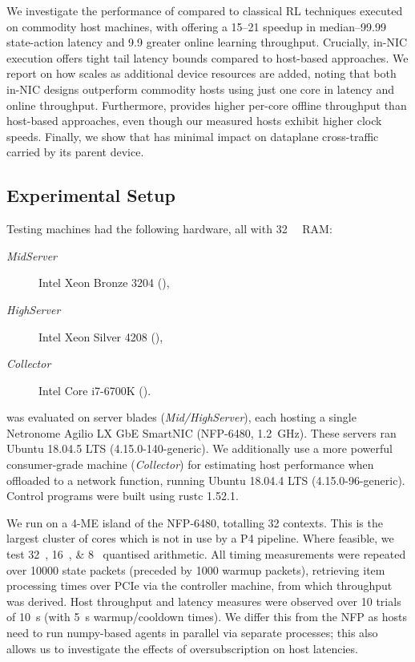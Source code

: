 We investigate the performance of \approachshort{} compared to classical RL techniques executed on commodity host machines, with \Coopfw{} offering a \qtyrange{15}{21}{\times} speedup in median--\num{99.99} state-action latency and \qty{9.9}{\times} greater online learning throughput.
Crucially, in-NIC execution offers tight tail latency bounds compared to host-based approaches.
We report on how \approachshort{} scales as additional device resources are added, noting that both in-NIC designs outperform commodity hosts using just one core in latency and online throughput.
Furthermore, \Indfw{} provides higher per-core offline throughput than host-based approaches, even though our measured hosts exhibit higher clock speeds.
Finally, we show that \approachshort{} has minimal impact on dataplane cross-traffic carried by its parent device.

\subsection{Experimental Setup}\label{sec:experimental-setup}
Testing machines had the following hardware, all with \qty{32}{\gibi\byte} RAM:
\begin{description}
	\item[\emph{MidServer}] Intel Xeon Bronze 3204 (),
	\item[\emph{HighServer}] Intel Xeon Silver 4208 (),
	\item[\emph{Collector}] Intel Core i7-6700K ().
\end{description}
\approachshort{} was evaluated on server blades (\emph{Mid/HighServer}), each hosting a single Netronome Agilio LX GbE SmartNIC (NFP-6480, \qty{1.2}{\giga\hertz}).
These servers ran Ubuntu 18.04.5 LTS (4.15.0-140-generic).
We additionally use a more powerful consumer-grade machine (\emph{Collector}) for estimating host performance when offloaded to a network function, running Ubuntu 18.04.4 LTS (4.15.0-96-generic).
Control programs were built using rustc 1.52.1.

We run \approachshort{} on a \num{4}-ME island of the NFP-6480, totalling \num{32} contexts.
This is the largest cluster of cores which is not in use by a P4 pipeline.
Where feasible, we test \qtylist{32;16;8}{\bit} quantised arithmetic.
All \approachshort{} timing measurements were repeated over \num{10000} state packets (preceded by \num{1000} warmup packets), retrieving item processing times over PCIe via the controller machine, from which throughput was derived.
Host throughput and latency measures were observed over \num{10} trials of \qty{10}{\second} (with \qty{5}{\second} warmup/cooldown times).
We differ this from the NFP as hosts need to run numpy-based agents in parallel via separate processes; this also allows us to investigate the effects of oversubscription on host latencies.

